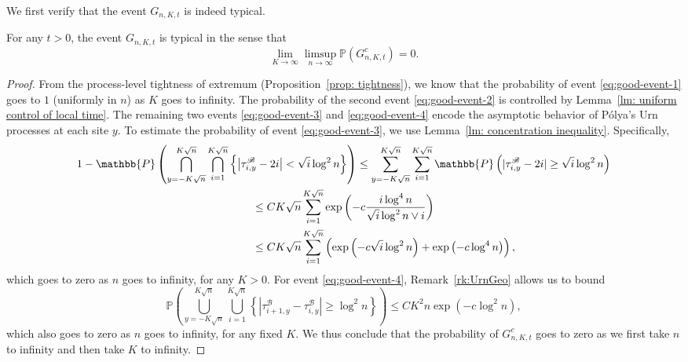 \documentclass[EJP]{ejpecp} %
\begin{document}
We first verify that the event $G_{n, K, t}$ is indeed typical.
\begin{lemma}
	\label{lm:good-event}
	For any $t > 0$, the event $G_{n,K,t}$ is typical in the sense that
	\[
	\lim_{K \to \infty } \limsup_{n \to \infty } 
	\mathbb{P}(G^c_{n, K,t}) = 0
	.\] 
\end{lemma}
\begin{proof}%
	From the process-level tightness of extremum (Proposition~\ref{prop: tightness}), we know that the probability of event \eqref{eq:good-event-1} goes to $1$ (uniformly in $n$) as $K $ goes to infinity. The probability of the second event \eqref{eq:good-event-2} is controlled by Lemma~\ref{lm: uniform control of local time}. 
	The remaining two events \eqref{eq:good-event-3} and \eqref{eq:good-event-4} encode the asymptotic behavior of P\'{o}lya's Urn processes at each site $y$. To estimate the probability of event \eqref{eq:good-event-3}, we use Lemma~\ref{lm: concentration inequality}. Specifically,
	\begin{align*}
		&1-\mathbb{P}\left(\bigcap_{y = -K \sqrt{n}}^{K \sqrt{n} }\bigcap_{i = 1}^{K \sqrt{n} } \left\{\left| \tau_{i,y}^{\mathscr{B}} - 2 i \right| < \sqrt{ i } \log^2 n \right\}
		\right)
		\le \sum_{y = - K \sqrt{n} }^{K \sqrt{n}}\sum_{i = 1}^{K \sqrt{n}} \mathbb{P}\left( |\tau_{i,y}^{\mathscr{B}} - 2i| \ge \sqrt{i} \log^2 n \right) \\
		&\hspace*{16em} \le CK \sqrt{n} \sum_{i = 1}^{K \sqrt{n}} \exp\left( - c \frac{i \log^4 n}{\sqrt{i}  \log^2 n \vee i} \right)  \\
		&\hspace*{16em} \le CK \sqrt{n}  \sum_{i = 1}^{K \sqrt{n}}
		\left( \exp\left( - c \sqrt{i}  \log^2 n \right)  +
		\exp\left( - c \log^4 n \right) \right),
	\end{align*}
	which goes to zero as $n$ goes to infinity, for any $K>0$. 
	For event \eqref{eq:good-event-4}, Remark~\ref{rk:UrnGeo} allows us to bound
	\[
	\mathbb{P}\left(\bigcup_{y = -K \sqrt{n}}^{K \sqrt{n} }\bigcup_{i = 1}^{K \sqrt{n}}\left\{\left| \tau_{i+1,y}^{\mathscr{B}} - \tau_{i,y}^{\mathscr{B}} \right| \ge  \log^2 n \right\}\right) 
	\le C K^2 n \exp\left( - c \log^2 n \right) 
	,\] 
	which also goes to zero as $n$ goes to infinity, for any fixed $K$. We thus conclude that the probability of $G^c_{n, K, t}$ goes to zero as we first take $n$ to infinity and then take $K$ to infinity.
\end{proof}
\end{document}
